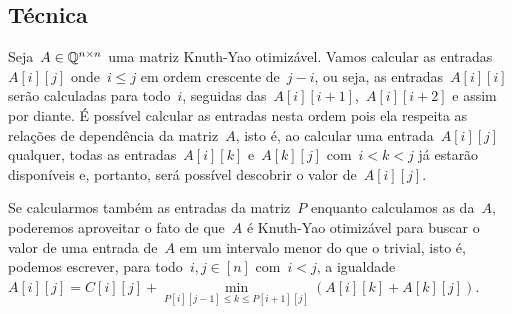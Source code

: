\subsection{Técnica}

Seja~$A \in \mathbb{Q}^{n \times n}$ uma matriz Knuth-Yao otimizável. Vamos calcular as entradas~$A[i][j]$ onde~$i \leq j$ em ordem crescente de~$j - i$, ou seja, as entradas~$A[i][i]$ serão calculadas para todo~$i$, seguidas das~$A[i][i+1]$,~$A[i][i+2]$ e assim por diante. É possível calcular as entradas nesta ordem pois ela respeita as relações de dependência da matriz~$A$, isto é, ao calcular uma entrada~$A[i][j]$ qualquer, todas as entradas~$A[i][k]$ e~$A[k][j]$ com~$i < k < j$ já estarão disponíveis e, portanto, será possível descobrir o valor de~$A[i][j]$.

Se calcularmos também as entradas da matriz~$P$ enquanto calculamos as da~$A$, poderemos aproveitar o fato de que~$A$ é Knuth-Yao otimizável para buscar o valor de uma entrada de~$A$ em um intervalo menor do que o trivial, isto é, podemos escrever, para todo~$i,j \in [n]$ com~$i < j$, a igualdade~${A[i][j] = C[i][j] + \min\limits_{P[i][j-1] \leq k \leq P[i+1][j]} (A[i][k] + A[k][j])}$.
